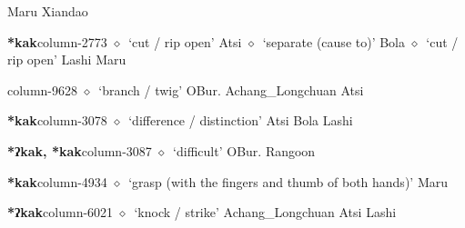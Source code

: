\hspace{1ex}
         Maru 
\hspace{1ex}
         Xiandao 
  \item {\footnotesize \textbf{*kak}}{\tiny column-2773}
         $\diamond$~`cut / rip open'
         Atsi 
\hspace{1ex}
         $\diamond$~`separate (cause to)'
         Bola 
\hspace{1ex}
         $\diamond$~`cut / rip open'
         Lashi 
\hspace{1ex}
         Maru 
  \item {\footnotesize \textbf{}}{\tiny column-9628}
         $\diamond$~`branch / twig'
         OBur. 
\hspace{1ex}
         Achang\_Longchuan 
\hspace{1ex}
         Atsi 
  \item {\footnotesize \textbf{*kak}}{\tiny column-3078}
         $\diamond$~`difference / distinction'
         Atsi 
\hspace{1ex}
         Bola 
\hspace{1ex}
         Lashi 
  \item {\footnotesize \textbf{*ʔkak, *kak}}{\tiny column-3087}
         $\diamond$~`difficult'
         OBur. 
\hspace{1ex}
         Rangoon 
  \item {\footnotesize \textbf{*kak}}{\tiny column-4934}
         $\diamond$~`grasp (with the fingers and thumb of both hands)'
         Maru 
  \item {\footnotesize \textbf{*ʔkak}}{\tiny column-6021}
         $\diamond$~`knock / strike'
         Achang\_Longchuan 
\hspace{1ex}
         Atsi 
\hspace{1ex}
         Lashi 
